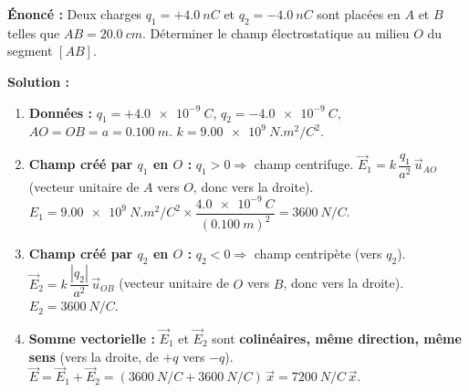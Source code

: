 \documentclass[11pt]{article}
\begin{document}
\begin{exemplebox}
\textbf{Énoncé :} Deux charges $q_1 = +\SI{4,0}{nC}$ et $q_2 = -\SI{4,0}{nC}$ sont placées en $A$ et $B$ telles que $AB = \SI{20,0}{cm}$. Déterminer le champ électrostatique au milieu $O$ du segment $[AB]$.

\textbf{Solution :}
\begin{enumerate}
    \item \textbf{Données :} $q_1 = +\SI{4,0e-9}{C}$, $q_2 = -\SI{4,0e-9}{C}$, $AO = OB = a = \SI{0,100}{m}$. $k = \SI{9,00e9}{N.m^2/C^2}$.
    \item \textbf{Champ créé par $q_1$ en $O$ :} $q_1 > 0 \Rightarrow$ champ centrifuge.
    $\vec{E}_1 = k\,\dfrac{q_1}{a^2}\,\vec{u}_{AO}$ (vecteur unitaire de $A$ vers $O$, donc vers la droite).
    $E_1 = \SI{9,00e9}{N.m^2/C^2} \times \dfrac{\SI{4,0e-9}{C}}{(\SI{0,100}{m})^2} = \SI{3600}{N/C}$.
    \item \textbf{Champ créé par $q_2$ en $O$ :} $q_2 < 0 \Rightarrow$ champ centripète (vers $q_2$).
    $\vec{E}_2 = k\,\dfrac{|q_2|}{a^2}\,\vec{u}_{OB}$ (vecteur unitaire de $O$ vers $B$, donc vers la droite).
    $E_2 = \SI{3600}{N/C}$.
    \item \textbf{Somme vectorielle :} $\vec{E}_1$ et $\vec{E}_2$ sont \textbf{colinéaires, même direction, même sens} (vers la droite, de $+q$ vers $-q$).
    $\vec{E} = \vec{E}_1 + \vec{E}_2 = (\SI{3600}{N/C} + \SI{3600}{N/C})\,\vec{x} = \SI{7200}{N/C}\,\vec{x}$.
\end{enumerate}
\end{exemplebox}
\end{document}
